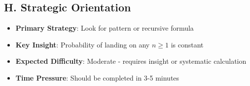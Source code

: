 \documentclass[11pt]{article}
\begin{document}
\begin{problembox}
\subsection*{H. Strategic Orientation}
\begin{itemize}[leftmargin=*]
    \item \textbf{Primary Strategy}: Look for pattern or recursive formula
    \item \textbf{Key Insight}: Probability of landing on any $n \geq 1$ is constant
    \item \textbf{Expected Difficulty}: Moderate - requires insight or systematic calculation
    \item \textbf{Time Pressure}: Should be completed in 3-5 minutes
\end{itemize}
\end{problembox}
\end{document}

